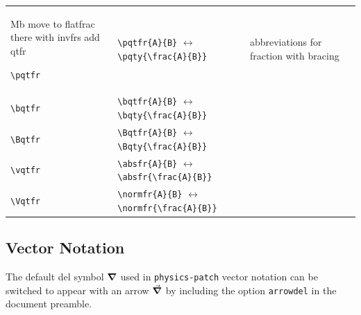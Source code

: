 \documentclass[a4paper,12pt]{article}
\begin{document}
\begin{longtable}[c]{|L{0.2\textwidth}|L{0.35\textwidth}|L{0.35\textwidth}|}
Mb move to flatfrac there with invfrs
add qtfr

\verb|\pqtfr| & \verb|\pqtfr{A}{B}| $\leftrightarrow$ \verb|\pqty{\frac{A}{B}}| & abbreviations for fraction with bracing \\
\verb|\bqtfr| & \verb|\bqtfr{A}{B}| $\leftrightarrow$ \verb|\bqty{\frac{A}{B}}| & \\
\verb|\Bqtfr| & \verb|\Bqtfr{A}{B}| $\leftrightarrow$ \verb|\Bqty{\frac{A}{B}}| & \\
\verb|\vqtfr| & \verb|\absfr{A}{B}| $\leftrightarrow$ \verb|\absfr{\frac{A}{B}}| & \\
\verb|\Vqtfr| & \verb|\normfr{A}{B}| $\leftrightarrow$ \verb|\normfr{\frac{A}{B}}| & \\\hline
\end{longtable}
\subsection{Vector Notation}
The default del symbol $\boldsymbol\nabla$ used in \texttt{physics-patch} vector notation can be switched to appear with an arrow $\vec{\boldsymbol\nabla}$ by including the option \texttt{arrowdel} in the document preamble.
\end{document}
